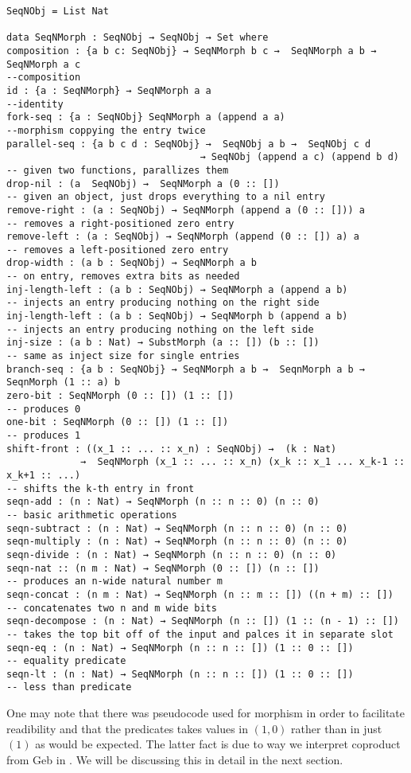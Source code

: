 \begin{verbatim}
SeqNObj = List Nat

data SeqNMorph : SeqNObj → SeqNObj → Set where
composition : {a b c: SeqNObj} → SeqNMorph b c →  SeqNMorph a b → SeqNMorph a c
--composition
id : {a : SeqNMorph} → SeqNMorph a a
--identity
fork-seq : {a : SeqNObj} SeqNMorph a (append a a)
--morphism coppying the entry twice
parallel-seq : {a b c d : SeqNObj} →  SeqNObj a b →  SeqNObj c d 
                                  → SeqNObj (append a c) (append b d)
-- given two functions, parallizes them                                
drop-nil : (a  SeqNObj) →  SeqNMorph a (0 :: [])
-- given an object, just drops everything to a nil entry
remove-right : (a : SeqNObj) → SeqNMorph (append a (0 :: [])) a
-- removes a right-positioned zero entry
remove-left : (a : SeqNObj) → SeqNMorph (append (0 :: []) a) a
-- removes a left-positioned zero entry
drop-width : (a b : SeqNObj) → SeqNMorph a b
-- on entry, removes extra bits as needed
inj-length-left : (a b : SeqNObj) → SeqNMorph a (append a b)
-- injects an entry producing nothing on the right side
inj-length-left : (a b : SeqNObj) → SeqNMorph b (append a b)
-- injects an entry producing nothing on the left side
inj-size : (a b : Nat) → SubstMorph (a :: []) (b :: [])
-- same as inject size for single entries
branch-seq : {a b : SeqNObj} → SeqNMorph a b →  SeqnMorph a b → SeqnMorph (1 :: a) b
zero-bit : SeqNMorph (0 :: []) (1 :: [])
-- produces 0
one-bit : SeqNMorph (0 :: []) (1 :: [])
-- produces 1
shift-front : ((x_1 :: ... :: x_n) : SeqNObj) →  (k : Nat) 
             →  SeqNMorph (x_1 :: ... :: x_n) (x_k :: x_1 ... x_k-1 :: x_k+1 :: ...)
-- shifts the k-th entry in front
seqn-add : (n : Nat) → SeqNMorph (n :: n :: 0) (n :: 0)
-- basic arithmetic operations
seqn-subtract : (n : Nat) → SeqNMorph (n :: n :: 0) (n :: 0)
seqn-multiply : (n : Nat) → SeqNMorph (n :: n :: 0) (n :: 0)
seqn-divide : (n : Nat) → SeqNMorph (n :: n :: 0) (n :: 0)
seqn-nat :: (n m : Nat) → SeqNMorph (0 :: []) (n :: [])
-- produces an n-wide natural number m
seqn-concat : (n m : Nat) → SeqNMorph (n :: m :: []) ((n + m) :: [])
-- concatenates two n and m wide bits
seqn-decompose : (n : Nat) → SeqNMorph (n :: []) (1 :: (n - 1) :: [])
-- takes the top bit off of the input and palces it in separate slot
seqn-eq : (n : Nat) → SeqNMorph (n :: n :: []) (1 :: 0 :: [])
-- equality predicate
seqn-lt : (n : Nat) → SeqNMorph (n :: n :: []) (1 :: 0 :: [])
-- less than predicate
\end{verbatim}

One may note that there was pseudocode used for  morphism in order to facilitate readibility and that the predicates takes values in $(1, 0)$ rather than in just $(1)$ as would be expected. The latter fact is due to way we interpret coproduct from Geb in \SeqN. We will be discussing this in detail in the next section.

